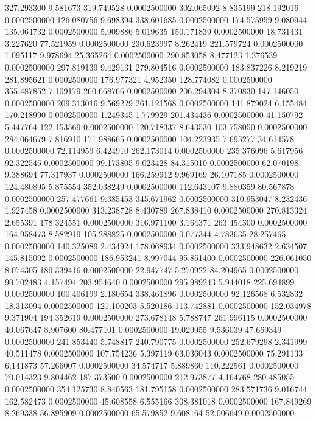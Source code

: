 327.293300 9.581673 319.749528 0.0002500000
302.065092 8.835199 218.192016 0.0002500000
126.080756 9.698394 338.601685 0.0002500000
174.575959 9.080944 135.064732 0.0002500000
5.909886 5.019635 150.171839 0.0002500000
18.731431 3.227620 77.521959 0.0002500000
230.623997 8.262419 221.579724 0.0002500000
1.095117 9.978694 25.365264 0.0002500000
290.853058 8.477123 1.376539 0.0002500000
297.819139 9.429131 279.804516 0.0002500000
183.837226 8.219219 281.895621 0.0002500000
176.977321 4.952350 128.774082 0.0002500000
355.487852 7.109179 260.668766 0.0002500000
206.294304 8.370830 147.146050 0.0002500000
209.313016 9.569229 261.121568 0.0002500000
141.879024 6.155484 170.218990 0.0002500000
1.249345 1.779929 201.434436 0.0002500000
41.150792 5.447764 122.153569 0.0002500000
120.718337 8.643530 103.758050 0.0002500000
284.064679 7.816910 171.988665 0.0002500000
104.223935 7.695277 34.614578 0.0002500000
72.114959 6.424910 262.173014 0.0002500000
235.376096 5.617956 92.322545 0.0002500000
99.173805 9.023428 84.315010 0.0002500000
62.070198 9.388694 77.317937 0.0002500000
166.259912 9.969169 26.107185 0.0002500000
124.480895 5.875554 352.038249 0.0002500000
112.643107 9.880359 80.567878 0.0002500000
257.477661 9.385453 345.671962 0.0002500000
310.953047 8.232436 1.927458 0.0002500000
313.238728 8.430789 267.838410 0.0002500000
270.813324 2.655391 178.324551 0.0002500000
316.971100 3.164371 263.454300 0.0002500000
164.958473 8.582919 105.288825 0.0002500000
0.077344 4.783635 28.257465 0.0002500000
140.325089 2.434924 178.068934 0.0002500000
333.948632 2.634507 145.815092 0.0002500000
186.953241 8.997044 95.851400 0.0002500000
226.061050 8.074305 189.339416 0.0002500000
22.947747 5.270922 84.204965 0.0002500000
90.702483 4.157494 203.954640 0.0002500000
295.989243 5.944018 225.694899 0.0002500000
100.406199 2.180654 338.461896 0.0002500000
92.126568 6.532832 18.313094 0.0002500000
121.100203 5.520186 113.742881 0.0002500000
152.034978 9.371904 194.352619 0.0002500000
273.678148 5.788747 261.996115 0.0002500000
40.067647 8.907600 80.477101 0.0002500000
19.029955 9.536039 47.669349 0.0002500000
241.853440 5.748817 240.790775 0.0002500000
252.679298 2.341999 40.511478 0.0002500000
107.754236 5.397119 63.036043 0.0002500000
75.291133 6.141873 57.266007 0.0002500000
34.574717 5.889860 110.222561 0.0002500000
70.014323 9.804462 187.373500 0.0002500000
212.973877 4.164768 280.485055 0.0002500000
354.125730 8.840563 181.795158 0.0002500000
283.571736 9.016744 162.582473 0.0002500000
45.608558 6.555166 308.381018 0.0002500000
167.849269 8.269338 56.895909 0.0002500000
65.579852 9.608164 52.006649 0.0002500000
